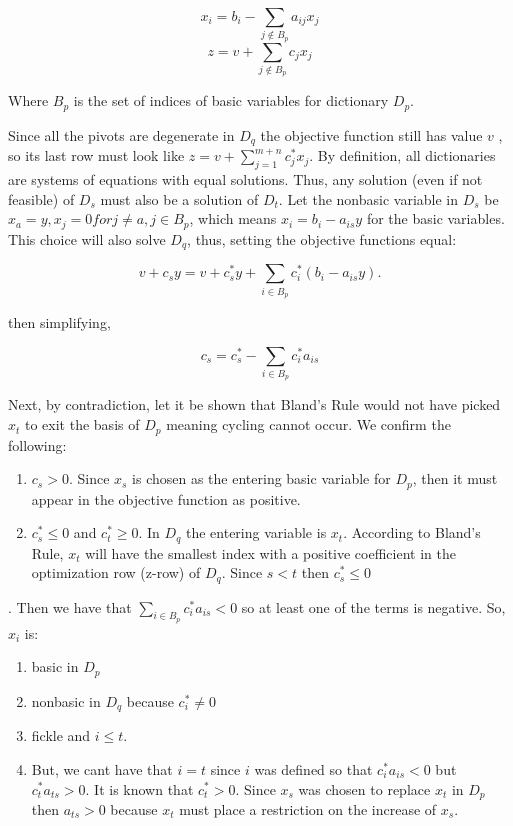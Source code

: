 \documentclass{article}
\begin{document}
 \begin{equation}
     x_i= b_i- \sum\limits_{j\notin B_p} a_{ij} x_{j} 
\end{equation}
\begin{equation}
 z= v+\sum\limits_{j\notin B_p} c_{j} x_{j} 
 \end{equation}

Where $B_p$ is the set of indices of basic variables for dictionary $D_p$.

Since all the pivots are degenerate in $D_q$ the objective function still has value $v$ , so its last row must look like $z=v+\sum\limits_{j=1}^{m+n} c^{*}_{j} x_{j}$. By definition, all dictionaries are systems of equations with equal solutions. Thus, any solution (even if not feasible) of $D_s$ must also be a solution of $D_t$. Let the nonbasic variable in $D_s$ be $x_a=y, x_j=0 for j \neq a, j \in B_p$, which means $x_i= b_i-a_{is}y$ for the basic variables. This choice will also solve $D_q$, thus, setting the objective functions equal:

\begin{equation}
    v+c_sy= v+c^*_sy+ \sum\limits_{i\in B_p} c^*_i (b_i-a_{is}y).
\end{equation}
 
then simplifying, 

\begin{equation}
    c_s= c^*_s- \sum\limits_{i \in B_p} c^*_i a_{is}
\end{equation}

Next, by contradiction, let it be shown that Bland’s Rule would not have picked $x_t$ to exit the basis of $D_p$ meaning cycling cannot occur. We confirm the following:
 
 \begin{enumerate}
     \item $c_s>0$. Since $x_s$ is chosen as the entering basic variable for $D_p$, then it must appear in the objective function as positive. 
     \item $c^*_s \leq 0 $ and $c^*_t \geq 0$. In $D_q$ the entering variable is $x_t$. According to Bland's Rule, $x_t$ will have the smallest index with a positive coefficient in the optimization row (z-row) of $D_q$. Since $s< t$ then $c^*_s \leq 0 $
 \end{enumerate}
    
.
Then we have that $\sum\limits_{i \in B_p} c^*_i a_{is} < 0$ so at least one of the terms is negative. 
So, $x_i$ is:

\begin{enumerate}
    \item basic in $D_p$
    \item nonbasic in $D_q$ because $ c^*_i \neq 0$
    \item fickle and $i \leq t$. 
    \item But, we cant have that $i=t$ since $i$ was defined so that $c^*_ia_{is}<0$ but $c^*_ta_{ts}>0$. It is known that $c^*_t>0$. Since $x_s$ was chosen to replace $x_t$ in $D_p$ then $a_{ts}>0$ because $x_t$ must place a restriction on the increase of $x_s$. 
\end{enumerate}
   
\end{document}

